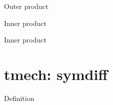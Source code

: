 \documentclass{beamer}
\begin{document}
\begin{frame}{Outer product}
\end{frame}

\begin{frame}{Inner product}
\end{frame}

\begin{frame}{Inner product}
\end{frame}



\section{tmech: symdiff}
\begin{frame}{Definition}
\end{frame} 
\end{document}
